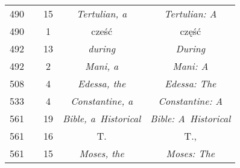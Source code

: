 \documentclass[a4paper,11pt]{article}
\numberwithin{equation}{section}
\begin{document}
\begin{center}
\begin{tabular}{|c|c|c|c|c|}
    490 & & 15 & \textit{Tertulian, a} & \textit{Tertulian: A} \\
    490 & & \hphantom{0}1 & cześć & część \\
    492 & & 13 & \textit{during} & \textit{During} \\
    492 & & \hphantom{0}2 & \textit{Mani, a} & \textit{Mani: A} \\
    508 & & \hphantom{0}4 & \textit{Edessa, the} & \textit{Edessa: The} \\
    533 & & \hphantom{0}4 & \textit{Constantine, a}
    & \textit{Constantine: A} \\
    561 & & 19 & \textit{Bible, a~Historical}
           & \textit{Bible: A~Historical} \\
    561 & & 16 & T. & T., \\
    561 & & 15 & \textit{Moses, the} & \textit{Moses: The} \\
    \hline
  \end{tabular}





  \newpage


\end{center}
\end{document}
